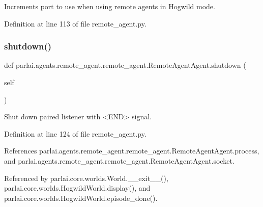 \begin{DoxyVerb}Increments port to use when using remote agents in Hogwild mode.\end{DoxyVerb}
 

Definition at line 113 of file remote\+\_\+agent.\+py.

\mbox{\label{classparlai_1_1agents_1_1remote__agent_1_1remote__agent_1_1RemoteAgentAgent_a1ca8a505b8d7cf89064c350736eb4ac0}} 
\subsubsection{\texorpdfstring{shutdown()}{shutdown()}}
{\footnotesize\ttfamily def parlai.\+agents.\+remote\+\_\+agent.\+remote\+\_\+agent.\+Remote\+Agent\+Agent.\+shutdown (\begin{DoxyParamCaption}\item[{}]{self }\end{DoxyParamCaption})}

\begin{DoxyVerb}Shut down paired listener with <END> signal.\end{DoxyVerb}
 

Definition at line 124 of file remote\+\_\+agent.\+py.



References parlai.\+agents.\+remote\+\_\+agent.\+remote\+\_\+agent.\+Remote\+Agent\+Agent.\+process, and parlai.\+agents.\+remote\+\_\+agent.\+remote\+\_\+agent.\+Remote\+Agent\+Agent.\+socket.



Referenced by parlai.\+core.\+worlds.\+World.\+\_\+\+\_\+exit\+\_\+\+\_\+(), parlai.\+core.\+worlds.\+Hogwild\+World.\+display(), and parlai.\+core.\+worlds.\+Hogwild\+World.\+episode\+\_\+done().

